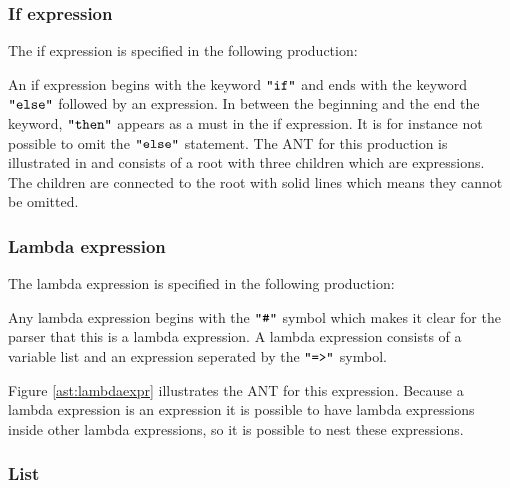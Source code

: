 \subsubsection{If expression}
The if expression is specified in the following production:

\begin{ebnf}
\end{ebnf}

An if expression begins with the keyword $\texttt{"if"}$ and ends with the keyword
$\texttt{"else"}$ followed by an expression. In between the beginning and the end the
keyword, $\texttt{"then"}$ appears as a must in the if expression. It is for instance not
possible to omit the $\texttt{"else"}$ statement. The ANT for this production is
illustrated in  and consists of a root with three children
which are expressions. The children are connected to the root with solid lines
which means they cannot be omitted.



\subsubsection{Lambda expression}

The lambda expression is specified in the following production:

\begin{ebnf}
\end{ebnf}

Any lambda expression begins with the $\texttt{"\#"}$ symbol which makes it clear for the
parser that this is a lambda expression. A lambda expression consists of a
variable list and an expression seperated by the $\texttt{"=>"}$ symbol.



Figure \ref{ast:lambdaexpr} illustrates the ANT for this expression. Because a
lambda expression is an expression it is possible to have lambda expressions
inside other lambda expressions, so it is possible to nest these expressions.

\subsubsection{List}

